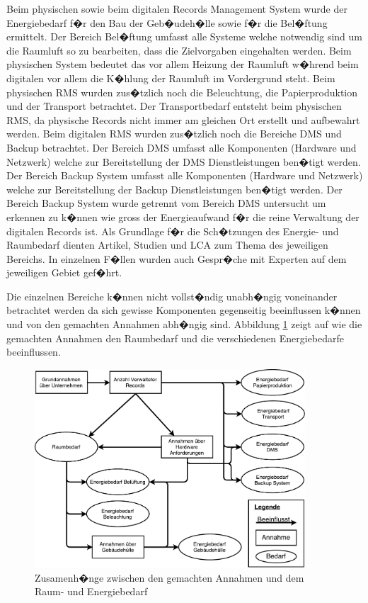 \documentclass[a4paper,twoside,10pt]{report}
\begin{document}
Beim physischen sowie beim digitalen Records Management System wurde der Energiebedarf f�r den Bau der Geb�udeh�lle sowie f�r die Bel�ftung ermittelt. Der Bereich Bel�ftung umfasst alle Systeme welche notwendig sind um die Raumluft so zu bearbeiten, dass die Zielvorgaben eingehalten werden. Beim physischen System bedeutet das vor allem Heizung der Raumluft w�hrend beim digitalen vor allem die K�hlung der Raumluft im Vordergrund steht. Beim physischen \ac{RMS} wurden zus�tzlich noch die Beleuchtung, die Papierproduktion und der Transport betrachtet. Der Transportbedarf entsteht beim physischen \ac{RMS}, da physische Records nicht immer am gleichen Ort erstellt und aufbewahrt werden. Beim digitalen \ac{RMS} wurden zus�tzlich noch die Bereiche \ac{DMS} und Backup betrachtet. Der Bereich DMS umfasst alle Komponenten (Hardware und Netzwerk) welche zur Bereitstellung der DMS Dienstleistungen ben�tigt werden. Der Bereich Backup System umfasst alle Komponenten (Hardware und Netzwerk) welche zur Bereitstellung der Backup Dienstleistungen ben�tigt werden. Der Bereich Backup System wurde getrennt vom Bereich \ac{DMS} untersucht um erkennen zu k�nnen wie gross der Energieaufwand f�r die reine Verwaltung der digitalen Records ist.  Als Grundlage f�r die Sch�tzungen des Energie- und Raumbedarf dienten Artikel, Studien und \acf{LCA} zum Thema des jeweiligen Bereichs. In einzelnen F�llen wurden auch Gespr�che mit Experten auf dem jeweiligen Gebiet gef�hrt.
 
Die einzelnen Bereiche k�nnen nicht vollst�ndig unabh�ngig voneinander betrachtet werden da sich gewisse Komponenten gegenseitig beeinflussen k�nnen und von den gemachten Annahmen abh�ngig sind. Abbildung \ref{img:komponenten} zeigt auf wie die gemachten Annahmen den Raumbedarf und die verschiedenen Energiebedarfe beeinflussen.  

\begin{figure}[htb]%
\includegraphics[width=0.9\textwidth]{Komponenten.pdf}%
\caption{Zusamenh�nge zwischen den gemachten Annahmen und dem Raum- und Energiebedarf }%
\label{img:komponenten}%
\end{figure}
\end{document}

